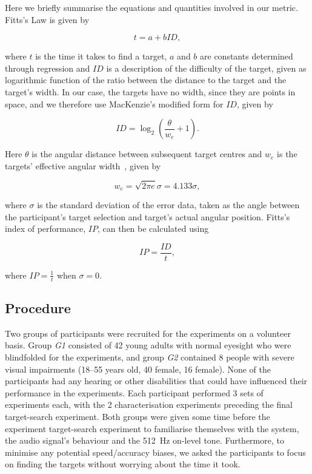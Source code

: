 \documentclass[]{interact}
\begin{document}
Here we briefly summarise the equations and quantities involved in our metric.
Fitts's Law is given by  

\begin{equation}
  \label{eq:fitts-base}
  t = a + bID,
\end{equation}

\noindent
where $t$ is the time it takes to find a target, $a$ and $b$ are constants determined through regression and $ID$ is a description of the difficulty of the target, given as logarithmic function of the ratio between the distance to the target and the target's width.
In our case, the targets have no width, since they are points in space, and we therefore use MacKenzie's modified form for $ID$, given by

\begin{equation}
  \label{eq:fitts-id}
  ID = \log_2\left(\frac{\theta}{w_e} + 1\right).
\end{equation}

\noindent
Here $\theta$ is the angular distance between subsequent target centres and $w_e$ is the targets' effective angular width~\citep{welford1968fundamentals}, given by

\begin{equation}
  \label{eq:fitts-we}
  w_e = \sqrt{2\pi e}\sigma = 4.133\sigma,
\end{equation}

\noindent
where $\sigma$ is the standard deviation of the error data, taken as the angle between the participant's target selection and target's actual angular position.
Fitts's index of performance, $IP$, can then be calculated using 

\begin{equation}
  \label{eq:fitts-performance}
  IP = \frac{ID}{t},
\end{equation}

\noindent
where $IP = \frac{1}{t}$ when $\sigma=0$.

\subsection{Procedure}

Two groups of participants were recruited for the experiments on a volunteer basis. 
Group \textit{G1} consisted of 42 young adults with normal eyesight who were blindfolded for the experiments, and group \textit{G2} contained 8 people with severe visual impairments (18--55 years old, 40 female, 16 female). 
None of the participants had any hearing or other disabilities that could have influenced their performance in the experiments.
Each participant performed 3 sets of experiments each, with the 2 characterisation experiments preceding the final target-search experiment. 
Both groups were given some time before the experiment target-search experiment to familiarise themselves with the system, the audio signal's behaviour and the \SI{512}{\hertz} on-level tone. 
Furthermore, to minimise any potential speed/accuracy biases, we asked the participants to focus on finding the targets without worrying about the time it took. 
\end{document}
